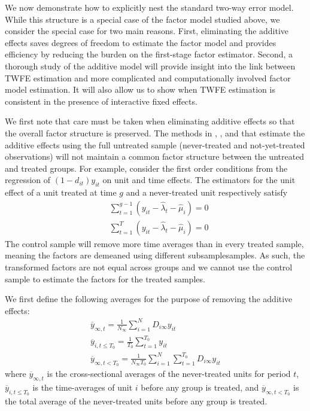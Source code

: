 \documentclass[12pt]{article}
\begin{document}
We now demonstrate how to explicitly nest the standard two-way error model. While this structure is a special case of the factor model studied above, we consider the special case for two main reasons. First, eliminating the additive effects saves degrees of freedom to estimate the factor model and provides efficiency by reducing the burden on the first-stage factor estimator. Second, a thorough study of the additive model will provide insight into the link between TWFE estimation and more complicated and computationally involved factor model estimation. It will also allow us to show when TWFE estimation is consistent in the presence of interactive fixed effects. 

We first note that care must be taken when eliminating additive effects so that the overall factor structure is preserved. The methods in \citet{Borusyak_Jaravel_Spiess_2021}, \citet{Gardner_2021}, and \cite{Wooldridge_2021} that estimate the additive effects using the full untreated sample (never-treated and not-yet-treated observations) will not maintain a common factor structure between the untreated and treated groups. For example, consider the first order conditions from the regression of $(1 - d_{it})y_{it}$ on unit and time effects. The estimators for the unit effect of a unit treated at time $g$ and a never-treated unit respectively satisfy
\begin{align}
  &\sum_{t = 1}^{g-1} (y_{it} - \widehat{\lambda}_t - \widehat{\mu}_i) = 0\\
  &\sum_{t = 1}^T (y_{it} - \widehat{\lambda}_t - \widehat{\mu}_i) = 0
\end{align}
The control sample will remove more time averages than in every treated sample, meaning the factors are demeaned using different subsamplesamples. As such, the transformed factors are not equal across groups and we cannot use the control sample to estimate the factors for the treated samples. 

We first define the following averages for the purpose of removing the additive effects:
\begin{gather}
  \overline{y}_{\infty , t} = \frac{1}{N_{\infty}} \sum_{i = 1}^N D_{i \infty} y_{it} \\
  \overline{y}_{i,t\leq T_0} = \frac{1}{T_0} \sum_{t = 1}^{T_0} y_{it} \\
  \overline{y}_{\infty, t < T_0} = \frac{1}{N_{\infty} T_0} \sum_{i = 1}^N \sum_{t = 1}^{T_0} D_{i \infty} y_{it}
\end{gather}
where $\overline{y}_{\infty , t}$ is the cross-sectional averages of the never-treated units for period $t$, $\overline{y}_{i,t\leq T_0}$ is the time-averages of unit $i$ before any group is treated, and $\overline{y}_{\infty, t < T_0}$ is the total average of the never-treated units before any group is treated.
\end{document}
